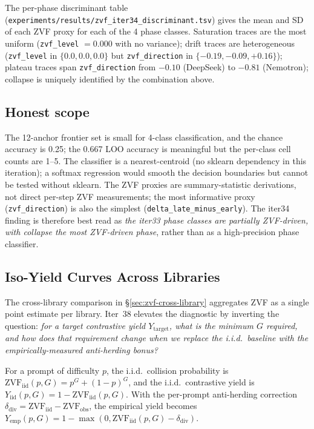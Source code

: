 \documentclass{article}
\begin{document}
The per-phase discriminant table
(\texttt{experiments/results/zvf\_iter34\_discriminant.tsv})
gives the mean and SD of each ZVF proxy for each of the 4 phase
classes. Saturation traces are the most uniform (\texttt{zvf\_level}
$= 0.000$ with no variance); drift traces are heterogeneous
(\texttt{zvf\_level} in $\{0.0, 0.0, 0.0\}$ but
\texttt{zvf\_direction} in $\{-0.19, -0.09, +0.16\}$); plateau
traces span \texttt{zvf\_direction} from $-0.10$ (DeepSeek) to
$-0.81$ (Nemotron); collapse is uniquely identified by the
combination above.

\subsection{Honest scope}
\label{sec:zvf-iter34-honest}

The 12-anchor frontier set is small for 4-class classification,
and the chance accuracy is 0.25; the 0.667 LOO accuracy is
meaningful but the per-class cell counts are 1--5. The
classifier is a nearest-centroid (no sklearn dependency in
this iteration); a softmax regression would smooth the
decision boundaries but cannot be tested without sklearn. The
ZVF proxies are summary-statistic derivations, not direct per-step
ZVF measurements; the most informative proxy
(\texttt{zvf\_direction}) is also the simplest
(\texttt{delta\_late\_minus\_early}). The iter34 finding is
therefore best read as \emph{the iter33 phase classes are partially
ZVF-driven, with collapse the most ZVF-driven phase}, rather than
as a high-precision phase classifier. 

\subsection{Iso-Yield Curves Across Libraries}
\label{sec:zvf-iso-yield}
The cross-library comparison in \S\ref{sec:zvf-cross-library} aggregates
ZVF as a single point estimate per library. Iter~38 elevates the
diagnostic by inverting the question: \emph{for a target contrastive
yield $Y_{\mathrm{target}}$, what is the minimum $G$ required, and how
does that requirement change when we replace the i.i.d.\ baseline with
the empirically-measured anti-herding bonus?}

For a prompt of difficulty $p$, the i.i.d.\ collision probability is
$\mathrm{ZVF}_{\mathrm{iid}}(p,G) = p^{G} + (1-p)^{G}$, and the
i.i.d.\ contrastive yield is $Y_{\mathrm{iid}}(p,G) = 1 -
\mathrm{ZVF}_{\mathrm{iid}}(p,G)$. With the per-prompt anti-herding
correction $\delta_{\mathrm{div}} = \mathrm{ZVF}_{\mathrm{iid}} -
\mathrm{ZVF}_{\mathrm{obs}}$, the empirical yield becomes
$Y_{\mathrm{emp}}(p,G) = 1 - \max(0, \mathrm{ZVF}_{\mathrm{iid}}(p,G) -
\delta_{\mathrm{div}})$.
\end{document}
